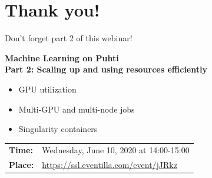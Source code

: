 \documentclass[aspectratio=1610,14pt]{beamer}
\newcommand{\link}[1]{\alert{\url{#1}}}
\begin{document}
\section*{Thank you!}

\begin{frame}{Don't forget part 2 of this webinar!}

  \textbf{Machine Learning on Puhti \\
    Part 2: Scaling up and using resources efficiently}

  \begin{itemize}
  \item GPU utilization
  \item Multi-GPU and multi-node jobs
  \item Singularity containers
  \end{itemize}

  \vfill

  \begin{tabular}{ll}
    \textbf{Time:}  & Wednesday, June 10, 2020 at 14:00-15:00 \\
    \textbf{Place:} & \link{https://ssl.eventilla.com/event/jJRkz} \\
  \end{tabular}

\end{frame}
\end{document}
